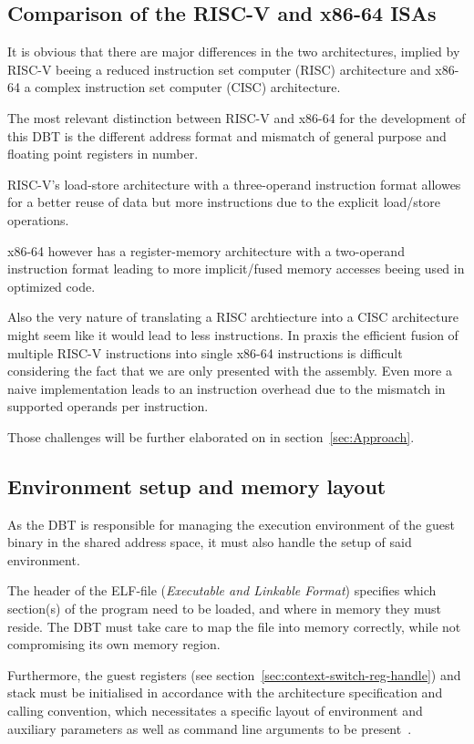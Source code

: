 
\subsection{Comparison of the RISC-V and x86-64 ISAs}
\label{sec:isa-cmp}
It is obvious that there are major differences in the two architectures, implied by RISC-V beeing a reduced instruction set computer (RISC) architecture and x86-64 a complex instruction set computer (CISC) architecture.

The most relevant distinction between RISC-V and x86-64 for the development of this DBT is the different address format and mismatch of general purpose and floating point registers in number.

RISC-V's load-store architecture with a three-operand instruction format allowes for a better reuse of data but more instructions due to the explicit load/store operations.

x86-64 however has a register-memory architecture with a two-operand instruction format leading to more implicit/fused memory accesses beeing used in optimized code.

Also the very nature of translating a RISC archtiecture into a CISC architecture might seem like it would lead to less instructions.
In praxis the efficient fusion of multiple RISC-V instructions into single x86-64 instructions is difficult considering the fact that we are only presented with the assembly.
Even more a naive implementation leads to an instruction overhead due to the mismatch in supported operands per instruction.

Those challenges will be further elaborated on in section~\ref{sec:Approach}.

\subsection{Environment setup and memory layout}
\label{sec:memory-layout}
As the DBT is responsible for managing the execution environment of the guest binary in the shared address space, it must also handle the setup of said environment.

The header of the ELF-file (\textit{Executable and Linkable Format}) specifies which section(s) of the program need to be loaded, and where in memory they must reside.
The DBT must take care to map the file into memory correctly, while not compromising its own memory region.

Furthermore, the guest registers (see section~\vref{sec:context-switch-reg-handle}) and stack must be initialised in accordance with the architecture specification and calling convention, which necessitates a specific layout of environment and auxiliary parameters as well as command line arguments to be present~\cite[S. 2]{bintrans}.

